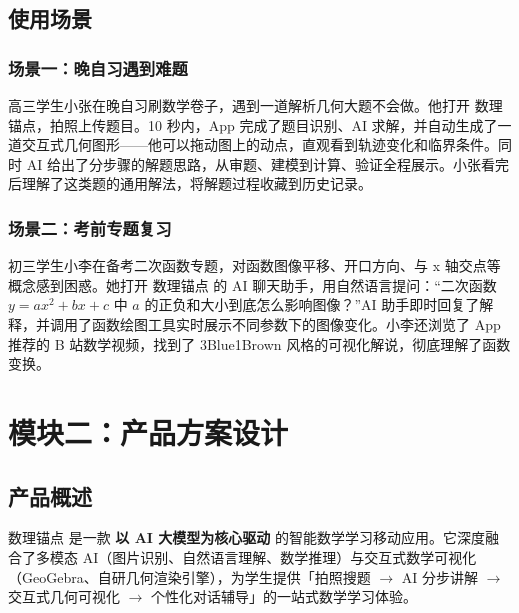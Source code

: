 \documentclass[12pt, a4paper]{ctexart}
\begin{document}
\subsection{使用场景}
\subsubsection{场景一：晚自习遇到难题}
高三学生小张在晚自习刷数学卷子，遇到一道解析几何大题不会做。他打开 数理锚点，拍照上传题目。10 秒内，App 完成了题目识别、AI 求解，并自动生成了一道交互式几何图形——他可以拖动图上的动点，直观看到轨迹变化和临界条件。同时 AI 给出了分步骤的解题思路，从审题、建模到计算、验证全程展示。小张看完后理解了这类题的通用解法，将解题过程收藏到历史记录。

\subsubsection{场景二：考前专题复习}
初三学生小李在备考二次函数专题，对函数图像平移、开口方向、与 x 轴交点等概念感到困惑。她打开 数理锚点 的 AI 聊天助手，用自然语言提问：“二次函数 $y=ax^2+bx+c$ 中 $a$ 的正负和大小到底怎么影响图像？”AI 助手即时回复了解释，并调用了函数绘图工具实时展示不同参数下的图像变化。小李还浏览了 App 推荐的 B 站数学视频，找到了 3Blue1Brown 风格的可视化解说，彻底理解了函数变换。

\section{模块二：产品方案设计}

\subsection{产品概述}
数理锚点 是一款 \textbf{以 AI 大模型为核心驱动} 的智能数学学习移动应用。它深度融合了多模态 AI（图片识别、自然语言理解、数学推理）与交互式数学可视化（GeoGebra、自研几何渲染引擎），为学生提供「拍照搜题 $\rightarrow$ AI 分步讲解 $\rightarrow$ 交互式几何可视化 $\rightarrow$ 个性化对话辅导」的一站式数学学习体验。
\end{document}

